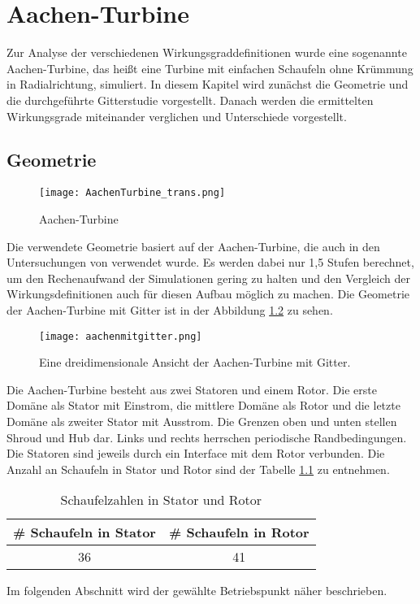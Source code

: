 \chapter{Aachen-Turbine}
\label{cha:aachen}
Zur Analyse der verschiedenen Wirkungsgraddefinitionen wurde eine sogenannte Aachen-Turbine, das heißt eine Turbine mit einfachen Schaufeln ohne Krümmung in Radialrichtung, simuliert. In diesem Kapitel wird zunächst die Geometrie und die durchgeführte Gitterstudie vorgestellt. Danach werden die ermittelten Wirkungsgrade miteinander verglichen und Unterschiede vorgestellt.
\section{Geometrie}
\label{sec:aachengeo}
  \begin{figure}[htbp]
	\centering
	\label{fig:imgAachenTurbine}
	\texttt{[image: AachenTurbine\_trans.png]}
	\caption{Aachen-Turbine}
\end{figure} 
Die verwendete Geometrie basiert auf der Aachen-Turbine, die auch in den Untersuchungen von \cite{ufi2001YaoDavis} 
verwendet wurde. Es werden dabei nur 1,5 Stufen berechnet, um den Rechenaufwand der Simulationen gering zu halten und den Vergleich der Wirkungsdefinitionen auch für diesen Aufbau möglich zu machen. Die Geometrie der Aachen-Turbine mit Gitter ist in der Abbildung \ref{fig:aachengebiet} zu sehen. 
\begin{figure}[htbp]
	\centering
	\texttt{[image: aachenmitgitter.png]}
	\caption{Eine dreidimensionale Ansicht der Aachen-Turbine mit Gitter.}
	\label{fig:aachengebiet}
\end{figure}
Die Aachen-Turbine besteht aus zwei Statoren und einem Rotor. Die erste Domäne als Stator mit Einstrom, die mittlere Domäne als Rotor und die letzte Domäne als zweiter Stator mit Ausstrom. Die Grenzen oben und unten stellen Shroud und Hub dar. Links und rechts herrschen periodische Randbedingungen. Die Statoren sind jeweils durch ein Interface mit dem Rotor verbunden. Die Anzahl an Schaufeln in Stator und Rotor sind der Tabelle \ref{tab:aachenabmessungen} zu entnehmen.\newline
\begin{table}[htbp]
\centering
\label{tab:aachenabmessungen}
\caption{Schaufelzahlen in Stator und Rotor}
\begin{tabular}{ c| c}
\# Schaufeln in Stator&\# Schaufeln in Rotor\\
\hline
36&41\\
\end{tabular}
\end{table}
Im folgenden Abschnitt wird der gewählte Betriebspunkt näher beschrieben.
